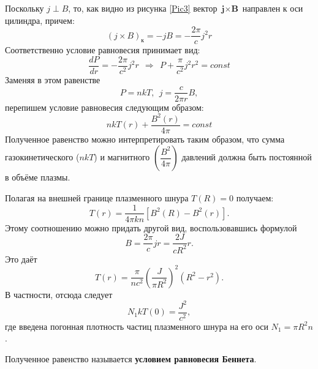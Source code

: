 \documentclass[12pt]{kiarticle} %
\begin{document}
	Поскольку $j \perp B$, то, как видно из рисунка \ref{Pic3} вектор $\textbf{j} \times \textbf{B}$ направлен к оси цилиндра, причем:
	\[ (j \times B)_к = -jB = -\dfrac{2\pi}{c} j^2r   \]
	Соответственно условие равновесия принимает вид:
	\[ \dfrac{dP}{dr} = -\dfrac{2\pi}{c^2}j^2r \ \ \Rightarrow \ \ P + \dfrac{\pi}{c^2}j^2r^2 = const \]
	Заменяя в этом равенстве
	\[  P = nkT, \ \ j = \dfrac{c}{2\pi r}B, \]
	перепишем условие равновесия следующим образом:
	\[ nkT(r) + \dfrac{B^2(r)}{4\pi} = const  \]
	Полученное равенство можно интерпретировать таким образом, что сумма газокинетического ($nkT$) и магнитного $(\dfrac{B^2}{4\pi})$ давлений должна быть постоянной в объёме плазмы.
	\par Полагая на внешней границе плазменного шнура $T(R) = 0$ получаем:
	\[ T(r) = \dfrac{1}{4\pi kn}\left[ B^2(R) - B^2(r) \right].  \]
	Этому соотношению можно придать другой вид, воспользовавшись формулой
	\[  B = \dfrac{2\pi}{c}jr = \dfrac{2J}{cR^2}r. \]
	Это даёт 
	\[ T(r) = \dfrac{\pi}{nc^2}\left( \dfrac{J}{\pi R^2} \right)^2(R^2 - r^2).  \]
	В частности, отсюда следует
	\[ N_1kT(0) = \dfrac{J^2}{c^2},  \]
	где введена погонная плотность частиц плазменного шнура на его оси $N_1 = \pi R^2 n$.
	\par Полученное равенство называется \textbf{условием равновесия Беннета}.
\end{document}
